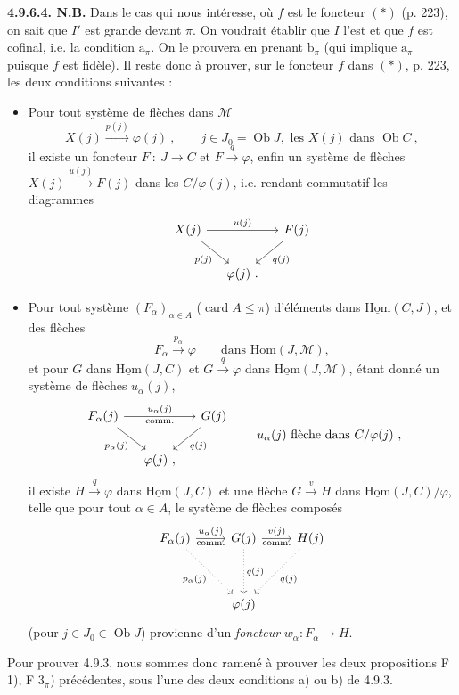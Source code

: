 \documentclass[11pt]{article}
\newcommand{\printedpage}[1]{\marginpar{\footnotesize p.~#1}}
\newcommand{\msp}[1]{\marginpar{\footnotesize [#1]}}
\newcommand{\uHom}{\underline{\mathrm{Hom}}}
\newcommand{\Ob}{\operatorname{Ob}}
\newcommand{\card}{\operatorname{card}}
\newcommand{\cM}{\mathcal{M}}
\begin{document}
\textbf{4.9.6.4. N.B.} Dans le cas qui nous intéresse, où $f$ est le foncteur $(*)$ (p. 223), on sait que $I'$ est grande devant $\pi$. On voudrait établir que $I$ l'est et que $f$ est cofinal, i.e. la condition $\mathrm{a}_\pi$. On le prouvera en prenant $\mathrm{b}_\pi$ (qui implique $\mathrm{a}_\pi$ puisque $f$ est fidèle). Il reste donc à
\msp{page 226}
prouver, sur le foncteur $f$ dans $(*)$, p. 223, les deux conditions suivantes :
\begin{itemize}[label={}]
\item[F 1)] Pour tout système de flèches dans $\cM$
\[
X(j) \xrightarrow{p(j)} \varphi(j) \ , \qquad j \in J_0 = \Ob J, \text{ les } X(j) \text{ dans } \Ob C \ ,
\]
il existe un foncteur $F \ : \ J \longrightarrow C$ et $F \xrightarrow{q} \varphi$, enfin un système de flèches $X(j) \xrightarrow{u(j)} F(j)$ dans les $C/\varphi(j)$, i.e. rendant commutatif les diagrammes %
\[
\begin{tikzcd}[column sep=small]
X(j) \arrow[rr, "u(j)"] \arrow[dr, "p(j)"'] & & F(j) \arrow[dl, "q(j)"] \\
& \varphi(j)\ . &
\end{tikzcd}
\]
\item[F $3_\pi$)] Pour tout système $(F_\alpha)_{\alpha \in A}$ ($\card A \leqslant \pi$) d'éléments dans $\uHom(C,J)$, et des flèches %
\[
F_\alpha \xrightarrow{p_\alpha} \varphi \qquad \text{dans } \uHom(J,\cM),
\]
et pour $G$ dans $\uHom(J,C)$ et $G \xrightarrow{q} \varphi$ dans $\uHom(J,\cM)$, étant donné un système de flèches $u_\alpha(j)$,
\printedpage{83}
\[
\begin{tikzcd}[column sep=small]
F_\alpha(j) \arrow[rr, "u_\alpha(j)", "\text{comm.}"'] \arrow[dr, "p_\alpha(j)"'] & & G(j) \arrow[dl, "q(j)"] \\
& \varphi(j)\ , &
\end{tikzcd}
\qquad u_\alpha(j) \text{ flèche dans } C/\varphi(j) \ ,
\]
il existe $H \xrightarrow{q} \varphi$ dans $\uHom(J,C)$ et une flèche $G \xrightarrow{v} H$ dans $\uHom(J,C)/\varphi$, telle que pour tout $\alpha \in A$, le système de flèches composés
\msp{page 227}
\[
\begin{tikzcd}[row sep=huge]
F_\alpha(j) \arrow[r, "u_\alpha(j)", "\text{comm.}"'] \arrow[dr, dotted, "p_\alpha(j)"'] & G(j) \arrow[r, "v(j)", "\text{comm.}"'] \arrow[d, dotted, "q(j)"] & H(j) \arrow[dl, dotted, "q(j)"] \\
& \varphi(j) &
\end{tikzcd}
\]
(pour $j \in J_0 \in \Ob J$) provienne d'un \textit{foncteur} $w_\alpha : F_\alpha \longrightarrow H$. %
\end{itemize}
Pour prouver 4.9.3, nous sommes donc ramené à prouver les deux propositions F 1), F $3_\pi$) précédentes, sous l'une des deux conditions a) ou b) de 4.9.3.
\end{document}
